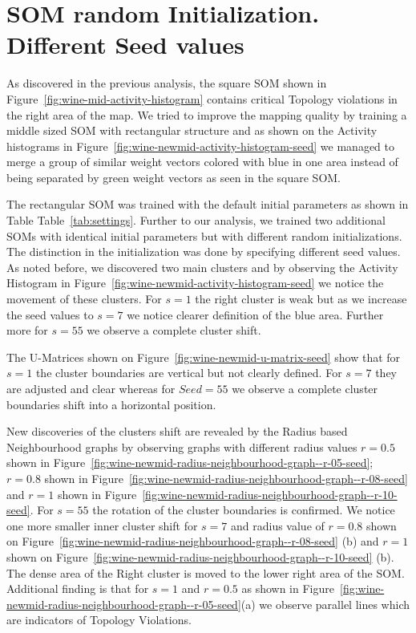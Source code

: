 \documentclass{acm_proc_article-sp}
\begin{document}
\section{SOM random Initialization. Different Seed values}

As discovered in the previous analysis, the square SOM shown in Figure~\ref{fig:wine-mid-activity-histogram} contains critical Topology violations in the right area of the map. We tried to improve the mapping quality by training a middle sized SOM with rectangular structure and as shown on the Activity histograms in Figure~\ref{fig:wine-newmid-activity-histogram-seed} we managed to merge a group of similar weight vectors colored with blue in one area instead of being separated by green weight vectors as seen in the square SOM.

The rectangular SOM was trained with the default initial parameters as shown in Table Table~\ref{tab:settings}. Further to our analysis, we trained two additional SOMs with identical initial parameters but with different random initializations. The distinction in the initialization was done by specifying different seed values. As noted before, we discovered two main clusters and by observing the Activity Histogram in Figure~\ref{fig:wine-newmid-activity-histogram-seed} we notice the movement of these clusters. For $s = 1$ the right cluster is weak but as we increase the seed values to $s = 7$ we notice clearer definition of the blue area. Further more for $s = 55$ we observe a complete cluster shift.

The U-Matrices shown on Figure~\ref{fig:wine-newmid-u-matrix-seed} show that for $s = 1$ the cluster boundaries are vertical but not clearly defined. For $s = 7$ they are adjusted and clear whereas for $Seed = 55$ we observe a complete cluster boundaries shift into a horizontal position. 

New discoveries of the clusters shift are revealed by the Radius based Neighbourhood graphs by observing graphs with different radius values $r = 0.5$ shown in Figure~\ref{fig:wine-newmid-radius-neighbourhood-graph--r-05-seed}; $r= 0.8$ shown in Figure~\ref{fig:wine-newmid-radius-neighbourhood-graph--r-08-seed} and $r = 1$ shown in Figure~\ref{fig:wine-newmid-radius-neighbourhood-graph--r-10-seed}. 
For $s = 55$ the rotation of the cluster boundaries is confirmed. We notice one more smaller inner cluster shift for $s = 7$ and radius value of $r = 0.8$ shown on Figure~\ref{fig:wine-newmid-radius-neighbourhood-graph--r-08-seed} (b) and $r = 1$ shown on Figure~\ref{fig:wine-newmid-radius-neighbourhood-graph--r-10-seed} (b). The dense area of the Right cluster is moved to the lower right area of the SOM. Additional finding is that for $s = 1$ and $r = 0.5$ as shown in Figure~\ref{fig:wine-newmid-radius-neighbourhood-graph--r-05-seed}(a) we observe parallel lines which are indicators of Topology Violations.
\end{document}
